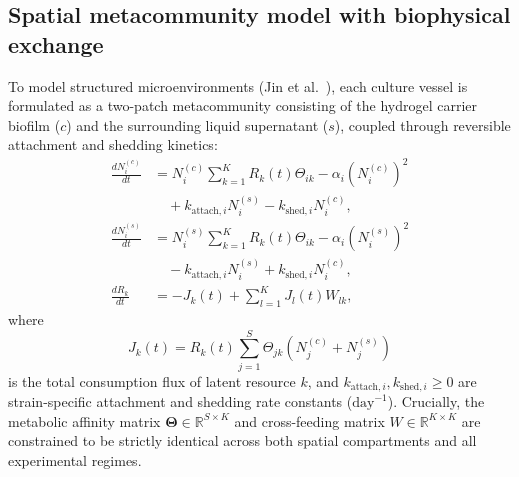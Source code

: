 \subsection*{Spatial metacommunity model with biophysical exchange}
To model structured microenvironments (Jin et al.~\cite{jin2023culturing}), each culture vessel is formulated as a two-patch metacommunity consisting of the hydrogel carrier biofilm ($c$) and the surrounding liquid supernatant ($s$), coupled through reversible attachment and shedding kinetics:
\begin{align}
\frac{dN_i^{(c)}}{dt} &= N_i^{(c)} \sum_{k=1}^K R_k(t) \Theta_{ik} - \alpha_i (N_i^{(c)})^2 \nonumber \\
&\quad + k_{\text{attach}, i} N_i^{(s)} - k_{\text{shed}, i} N_i^{(c)}, \label{eq:methods_coupled_c} \\
\frac{dN_i^{(s)}}{dt} &= N_i^{(s)} \sum_{k=1}^K R_k(t) \Theta_{ik} - \alpha_i (N_i^{(s)})^2 \nonumber \\
&\quad - k_{\text{attach}, i} N_i^{(s)} + k_{\text{shed}, i} N_i^{(c)}, \label{eq:methods_coupled_s} \\
\frac{dR_k}{dt} &= - J_k(t) + \sum_{l=1}^K J_l(t) W_{lk}, \label{eq:methods_coupled_r}
\end{align}
where
\begin{equation}
J_k(t) = R_k(t) \sum_{j=1}^S \Theta_{jk} \left( N_j^{(c)} + N_j^{(s)} \right)
\label{eq:methods_flux}
\end{equation}
is the total consumption flux of latent resource $k$, and $k_{\text{attach}, i}, k_{\text{shed}, i} \ge 0$ are strain-specific attachment and shedding rate constants ($\text{day}^{-1}$). Crucially, the metabolic affinity matrix $\mathbf{\Theta} \in \mathbb{R}^{S \times K}$ and cross-feeding matrix $W \in \mathbb{R}^{K \times K}$ are constrained to be strictly identical across both spatial compartments and all experimental regimes.

